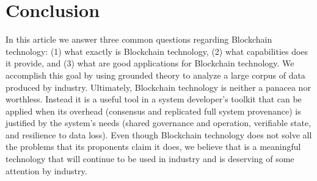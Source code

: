 
\section{Conclusion}
In this article we answer three common questions regarding Blockchain technology: (1) what exactly is Blockchain technology, (2) what capabilities does it provide, and (3) what are good applications for Blockchain technology.
We accomplish this goal by using grounded theory to analyze a large corpus of data produced by industry.
Ultimately, Blockchain technology is neither a panacea nor worthless.
Instead it is a useful tool in a system developer's toolkit that can be applied when its overhead (consensus and replicated full system provenance) is justified by the system's needs (shared governance and operation, verifiable state, and resilience to data loss).
Even though Blockchain technology does not solve all the problems that its proponents claim it does, we believe that is a meaningful technology that will continue to be used in industry and is deserving of some attention by industry.